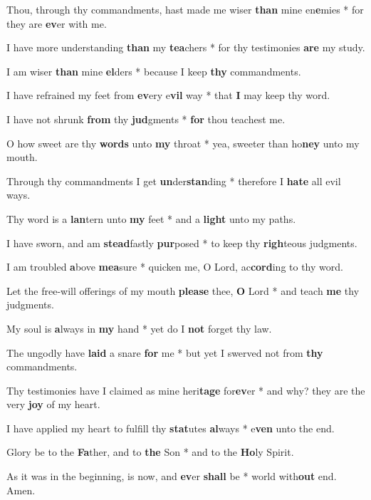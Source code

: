 \begin{multicols}{2}
	Thou, through thy commandments, hast made me wiser \textbf{than} mine en\textbf{e}mies * for they are \textbf{ev}er with me.
	
	I have more understanding \textbf{than} my \textbf{tea}chers * for thy testimonies \textbf{are} my study.
	
	I am wiser \textbf{than} mine \textbf{el}ders * because I keep \textbf{thy} commandments.
	
	I have refrained my feet from \textbf{ev}ery e\textbf{vil} way * that \textbf{I} may keep thy word.
	
	I have not shrunk \textbf{from} thy \textbf{jud}gments * \textbf{for} thou teachest me.
	
	O how sweet are thy \textbf{words} unto \textbf{my} throat * yea, sweeter than ho\textbf{ney} unto my mouth.
	
	Through thy commandments I get \textbf{un}der\textbf{stan}ding * therefore I \textbf{hate} all evil ways.
	
	Thy word is a \textbf{lan}tern unto \textbf{my} feet * and a \textbf{light} unto my paths.
	
	I have sworn, and am \textbf{stead}fastly \textbf{pur}posed * to keep thy \textbf{righ}teous judgments.
	
	I am troubled \textbf{a}bove \textbf{mea}sure * quicken me, O Lord, ac\textbf{cord}ing to thy word.
	
	Let the free-will offerings of my mouth \textbf{please} thee, \textbf{O} Lord * and teach \textbf{me} thy judgments.
	
	My soul is \textbf{a}lways in \textbf{my} hand * yet do I \textbf{not} forget thy law.
	
	The ungodly have \textbf{laid} a snare \textbf{for} me * but yet I swerved not from \textbf{thy} commandments.
	
	Thy testimonies have I claimed as mine heri\textbf{tage} for\textbf{ev}er * and why? they are the very \textbf{joy} of my heart.
	
	I have applied my heart to fulfill thy \textbf{stat}utes \textbf{al}ways * e\textbf{ven} unto the end.
	
	Glory be to the \textbf{Fa}ther, and to \textbf{the} Son * and to the \textbf{Ho}ly Spirit.
	
	As it was in the beginning, is now, and \textbf{ev}er \textbf{shall} be * world with\textbf{out} end. Amen.
\end{multicols}
